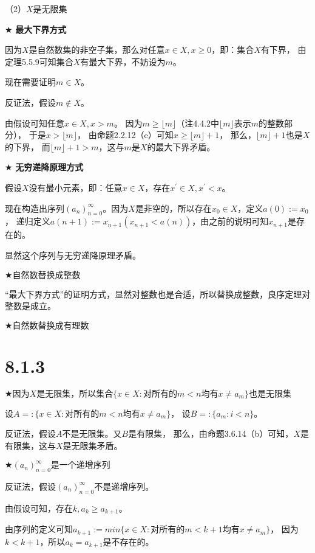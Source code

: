 \documentclass{article}
\theoremstyle{mystyle}
\begin{document}
（2）$X$是无限集

$\bigstar$ \textbf{最大下界方式}

因为$X$是自然数集的非空子集，那么对任意$x \in X, x \geq 0$，即：集合$X$有下界，
由定理5.5.9可知集合$X$有最大下界，不妨设为$m$。

现在需要证明$m \in X$。

反证法，假设$m \not \in X$。

由假设可知任意$x \in X, x > m$。
因为$m \geq \lfloor m \rfloor$（注4.4.2中$\lfloor m \rfloor$表示$m$的整数部分），
于是$x > \lfloor m \rfloor$，
由命题2.2.12（e）可知$x \geq \lfloor m \rfloor + 1$，
那么，$\lfloor m \rfloor + 1$也是$X$的下界，
而$\lfloor m \rfloor + 1 > m$，这与$m$是$X$的最大下界矛盾。

$\bigstar$ \textbf{无穷递降原理方式}

假设$X$没有最小元素，即：任意$x \in X$，存在$x^\prime \in X, x^\prime < x$。

现在构造出序列$(a_n)_{n=0}^\infty$。因为$X$是非空的，所以存在$x_0 \in X$，定义$a(0) := x_0$，
递归定义$a(n+1) := x_{n+1} (x_{n+1} < a(n))$，由之前的说明可知$x_{n+1}$是存在的。

显然这个序列与无穷递降原理矛盾。

$\bigstar \textbf{自然数替换成整数}$

“最大下界方式”的证明方式，显然对整数也是合适，所以替换成整数，良序定理对整数是成立。

$\bigstar \textbf{自然数替换成有理数}$

\section*{8.1.3}

$\bigstar \textbf{因为$X$是无限集，所以集合$\{x \in X: \text{对所有的$m < n$均有$x \neq a_m$}\}$也是无限集}$

设$A =: \{x \in X: \text{对所有的$m < n$均有$x \neq a_m$}\}$，
设$B =: \{a_m: i < n\}$。

反证法，假设$A$不是无限集。又$B$是有限集，
那么，由命题3.6.14（b）可知，$X$是有限集，这与$X$是无限集矛盾。

$\bigstar (a_n)_{n=0}^\infty \textbf{是一个递增序列} $

反证法，假设$(a_n)_{n=0}^\infty$不是递增序列。

由假设可知，存在$k, a_k \geq a_{k+1}$。

由序列的定义可知$a_{k+1} := min\{x \in X: \text{对所有的$m < k+1$均有$x \neq a_m$}\}$，
因为$k < k+1$，所以$a_k = a_{k+1}$是不存在的。
\end{document}
